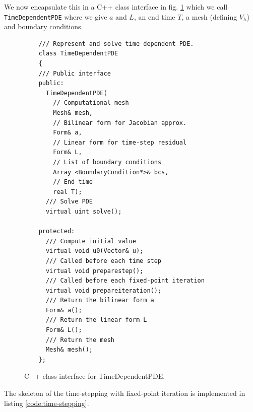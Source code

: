 We now encapsulate this in a C++ class interface in
fig. \ref{code:TimeDependentPDE} which we call {\tt TimeDependentPDE} where
we give $a$ and $L$, an end time $T$, a mesh (defining $V_h$) and
boundary conditions.



\begin{figure}[!h]
\begin{lstlisting}
    /// Represent and solve time dependent PDE.
    class TimeDependentPDE
    {
    /// Public interface
    public:
      TimeDependentPDE(
        // Computational mesh
        Mesh& mesh,
        // Bilinear form for Jacobian approx.
        Form& a,
        // Linear form for time-step residual
        Form& L,
        // List of boundary conditions
        Array <BoundaryCondition*>& bcs,
        // End time
        real T);
      /// Solve PDE
      virtual uint solve();

    protected:
      /// Compute initial value
      virtual void u0(Vector& u);
      /// Called before each time step
      virtual void preparestep();
      /// Called before each fixed-point iteration
      virtual void prepareiteration();
      /// Return the bilinear form a
      Form& a();
      /// Return the linear form L
      Form& L();
      /// Return the mesh
      Mesh& mesh();
    };
\end{lstlisting}
\caption{
C++ class interface for TimeDependentPDE.
}
\label{code:TimeDependentPDE}
\end{figure}


The skeleton of the time-stepping with fixed-point iteration is
implemented in listing \ref{code:time-stepping}.


